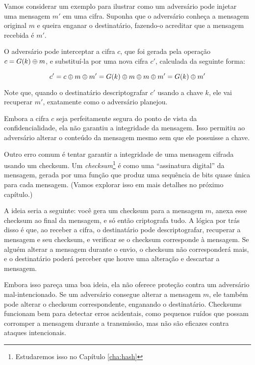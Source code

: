 \begin{example}
Vamos considerar um exemplo para ilustrar como um adversário pode injetar uma mensagem $m'$ em uma cifra.
Suponha que o adversário conheça a mensagem original $m$ e queira enganar o destinatário, fazendo-o acreditar que a mensagem recebida é $m'$.

O adversário pode interceptar a cifra $c$, que foi gerada pela operação $c = G(k) \oplus m$, e substituí-la por uma nova cifra $c'$, calculada da seguinte forma:

\begin{displaymath}
c' = c \oplus m \oplus m' = G(k) \oplus m \oplus m \oplus m' = G(k) \oplus m'
\end{displaymath}

Note que, quando o destinatário descriptografar $c'$ usando a chave $k$, ele vai recuperar $m'$, exatamente como o adversário planejou.

Embora a cifra $c$ seja perfeitamente segura do ponto de vista da confidencialidade, ela não garantiu a integridade da mensagem.
Isso permitiu ao adversário alterar o conteúdo da mensagem mesmo sem que ele possuisse a chave.
\end{example}

\begin{example}
  Outro erro comum é tentar garantir a integridade de uma mensagem cifrada usando um checksum.
  Um {\em checksum}\footnote{Estudaremos isso no Capítulo \ref{cha:hash}} é como uma ``assinatura digital'' da mensagem, gerada por uma função que produz uma sequência de bits quase única para cada mensagem.
(Vamos explorar isso em mais detalhes no próximo capítulo.)

A ideia seria a seguinte: você gera um checksum para a mensagem $m$, anexa esse checksum ao final da mensagem, e só então criptografa tudo.
A lógica por trás disso é que, ao receber a cifra, o destinatário pode descriptografar, recuperar a mensagem e seu checksum, e verificar se o checksum corresponde à mensagem.
Se alguém alterar a mensagem durante o envio, o checksum não corresponderá mais, e o destinatário poderá perceber que houve uma alteração e descartar a mensagem.

Embora isso pareça uma boa ideia, ela não oferece proteção contra um adversário mal-intencionado.
Se um adversário consegue alterar a mensagem $m$, ele também pode alterar o checksum correspondente, enganando o destinatário.
Checksums funcionam bem para detectar erros acidentais, como pequenos ruídos que possam corromper a mensagem durante a transmissão, mas não são eficazes contra ataques intencionais.

\end{example}

